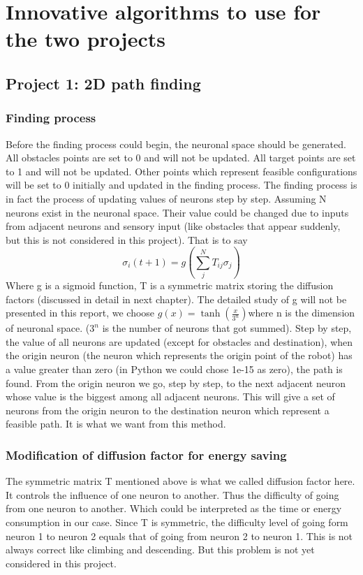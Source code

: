 \chapter{Innovative algorithms to use for the two projects}
\label{cha:algorithm}

\section{Project 1: 2D path finding}
\label{sec:algorithm_project1}

\subsection{Finding process}
Before the finding process could begin, the neuronal space should be generated. 
All obstacles points are set to 0 and will not be updated. 
All target points are set to 1 and will not be updated. 
Other points which represent feasible configurations will be set to 0 initially and updated in the finding process. 
The finding process is in fact the process of updating values of neurons step by step. 
Assuming N neurons exist in the neuronal space. 
Their value could be changed due to inputs from adjacent neurons and sensory input (like obstacles that appear suddenly, but this is not considered in this project). 
That is to say
\[ \sigma_i(t+1)=g(\sum_{j}^{N}{T_{ij}\sigma_j}) \]
Where g is a sigmoid function, T is a symmetric matrix storing the diffusion factors (discussed in detail in next chapter). 
The detailed study of g will not be presented in this report, we choose \(g(x)=\tanh(\frac{x}{3^n}) \)where n is the dimension of neuronal space. 
(\(3^n\) is the number of neurons that got summed).
Step by step, the value of all neurons are updated (except for obstacles and destination), when the origin neuron (the neuron which represents the origin point of the robot) has a value greater than zero (in Python we could chose 1e-15 as zero), the path is found. From the origin neuron we go, step by step, to the next adjacent neuron whose value is the biggest among all adjacent neurons. This will give a set of neurons from the origin neuron to the destination neuron which represent a feasible path. It is what we want from this method. 

\subsection{Modification of diffusion factor for energy saving}
The symmetric matrix T mentioned above is what we called diffusion factor here. 
It controls the influence of one neuron to another. 
Thus the difficulty of going from one neuron to another. 
Which could be interpreted as the time or energy consumption in our case. 
Since T is symmetric, the difficulty level of going form neuron 1 to neuron 2 equals that of going from neuron 2 to neuron 1. 
This is not always correct like climbing and descending. 
But this problem is not yet considered in this project. 

